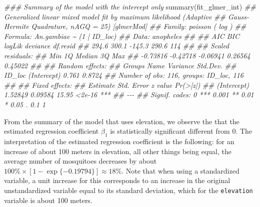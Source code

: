 \documentclass[
  letterpaper,
]{krantz}
\newenvironment{Shaded}{\begin{snugshade}}{\end{snugshade}}
\newcommand{\DocumentationTok}[1]{\textcolor[rgb]{0.37,0.37,0.37}{\textit{#1}}}
\newcommand{\FunctionTok}[1]{\textcolor[rgb]{0.28,0.35,0.67}{#1}}
\newcommand{\NormalTok}[1]{\textcolor[rgb]{0.00,0.23,0.31}{#1}}
\begin{document}
\begin{Shaded}
\begin{Highlighting}[]
\DocumentationTok{\#\#\# Summary of the model with the intercept only}
\FunctionTok{summary}\NormalTok{(fit\_glmer\_int)}
\DocumentationTok{\#\# Generalized linear mixed model fit by maximum likelihood (Adaptive}
\DocumentationTok{\#\#   Gauss{-}Hermite Quadrature, nAGQ = 25) [glmerMod]}
\DocumentationTok{\#\#  Family: poisson  ( log )}
\DocumentationTok{\#\# Formula: An.gambiae \textasciitilde{} (1 | ID\_loc)}
\DocumentationTok{\#\#    Data: anopheles}
\DocumentationTok{\#\# }
\DocumentationTok{\#\#      AIC      BIC   logLik deviance df.resid }
\DocumentationTok{\#\#    294.6    300.1   {-}145.3    290.6      114 }
\DocumentationTok{\#\# }
\DocumentationTok{\#\# Scaled residuals: }
\DocumentationTok{\#\#      Min       1Q   Median       3Q      Max }
\DocumentationTok{\#\# {-}0.73816 {-}0.42718 {-}0.06941  0.26564  0.45022 }
\DocumentationTok{\#\# }
\DocumentationTok{\#\# Random effects:}
\DocumentationTok{\#\#  Groups Name        Variance Std.Dev.}
\DocumentationTok{\#\#  ID\_loc (Intercept) 0.761    0.8724  }
\DocumentationTok{\#\# Number of obs: 116, groups:  ID\_loc, 116}
\DocumentationTok{\#\# }
\DocumentationTok{\#\# Fixed effects:}
\DocumentationTok{\#\#             Estimate Std. Error z value Pr(\textgreater{}|z|)    }
\DocumentationTok{\#\# (Intercept)  1.52849    0.09584   15.95   \textless{}2e{-}16 ***}
\DocumentationTok{\#\# {-}{-}{-}}
\DocumentationTok{\#\# Signif. codes:  0 \textquotesingle{}***\textquotesingle{} 0.001 \textquotesingle{}**\textquotesingle{} 0.01 \textquotesingle{}*\textquotesingle{} 0.05 \textquotesingle{}.\textquotesingle{} 0.1 \textquotesingle{} \textquotesingle{} 1}
\end{Highlighting}
\end{Shaded}

From the summary of the model that uses elevation, we observe the that
the estimated regression coefficient \(\beta_{1}\) is statistically
significant different from 0. The interpretation of the estimated
regression coefficient is the following: for an increase of about 100
meters in elevation, all other things being equal, the average number of
mosquitoes decreases by about
\(100\% \times [1-\exp\{-0.19794\}] \approx 18\%\). Note that when using
a standardized variable, a unit increase for this corresponds to an
increase in the original unstandardized variable equal to its standard
deviation, which for the \texttt{elevation} variable is about 100
meters.
\end{document}
